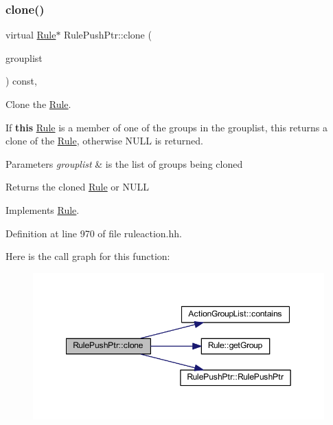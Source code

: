 \subsubsection{\texorpdfstring{clone()}{clone()}}
{\footnotesize\ttfamily virtual \mbox{\hyperlink{class_rule}{Rule}}$\ast$ Rule\+Push\+Ptr\+::clone (\begin{DoxyParamCaption}\item[{const \mbox{\hyperlink{class_action_group_list}{Action\+Group\+List}} \&}]{grouplist }\end{DoxyParamCaption}) const\hspace{0.3cm}{\ttfamily [inline]}, {\ttfamily [virtual]}}



Clone the \mbox{\hyperlink{class_rule}{Rule}}. 

If {\bfseries{this}} \mbox{\hyperlink{class_rule}{Rule}} is a member of one of the groups in the grouplist, this returns a clone of the \mbox{\hyperlink{class_rule}{Rule}}, otherwise N\+U\+LL is returned. 
\begin{DoxyParams}{Parameters}
{\em grouplist} & is the list of groups being cloned \\
\hline
\end{DoxyParams}
\begin{DoxyReturn}{Returns}
the cloned \mbox{\hyperlink{class_rule}{Rule}} or N\+U\+LL 
\end{DoxyReturn}


Implements \mbox{\hyperlink{class_rule_a70de90a76461bfa7ea0b575ce3c11e4d}{Rule}}.



Definition at line 970 of file ruleaction.\+hh.

Here is the call graph for this function\+:
\nopagebreak
\begin{figure}[H]
\begin{center}
\leavevmode
\includegraphics[width=349pt]{class_rule_push_ptr_aff0b20b5e618f30ed4be5fb948766669_cgraph}
\end{center}
\end{figure}
\mbox{\label{class_rule_push_ptr_a6c610129395e97ca75570fbb88565b35}} 

